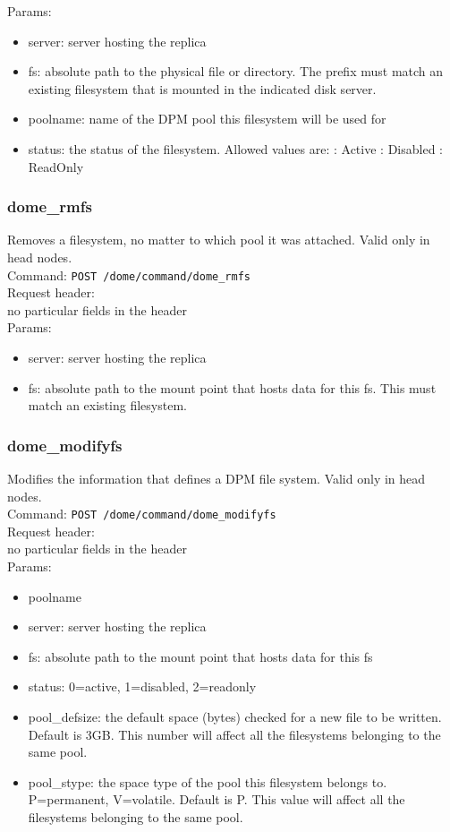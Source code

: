 \documentclass[a4paper,10pt]{scrreprt}
\begin{document}
Params:
\begin{itemize}
 \item server: server hosting the replica
 \item fs: absolute path to the physical file or directory. The prefix must match an existing filesystem that is mounted in the indicated disk server.
 \item poolname: name of the DPM pool this filesystem will be used for
 \item status: the status of the filesystem. Allowed values are:
  : Active
  : Disabled
  : ReadOnly
\end{itemize}


\subsubsection{dome\_rmfs}

Removes a filesystem, no matter to which pool it was attached. Valid only in head nodes.\\
Command:
\lstinline"POST /dome/command/dome_rmfs"\\
Request header:\\
 no particular fields in the header\\

Params:
\begin{itemize}
 \item server: server hosting the replica
 \item fs: absolute path to the mount point that hosts data for this fs. This must match an existing filesystem.
\end{itemize}


\subsubsection{dome\_modifyfs}

Modifies the information that defines a DPM file system. Valid only in head nodes.\\
Command:
\lstinline"POST /dome/command/dome_modifyfs"\\
Request header:\\
 no particular fields in the header\\

Params:
\begin{itemize}
 \item poolname
 \item server: server hosting the replica
 \item fs: absolute path to the mount point that hosts data for this fs
 \item status: 0=active, 1=disabled, 2=readonly
 \item pool\_defsize: the default space (bytes) checked for a new file to be written. Default is 3GB. This number will affect all the filesystems belonging to the same pool.
 \item pool\_stype: the space type of the pool this filesystem belongs to. P=permanent, V=volatile. Default is P. This value will affect all the filesystems belonging to the same pool.
\end{itemize}
\end{document}
